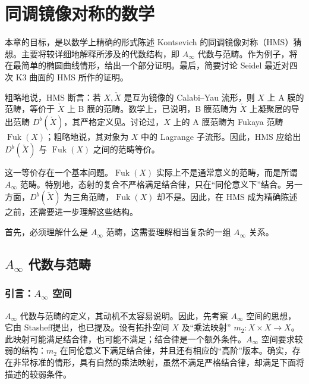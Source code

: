\chapter{同调镜像对称的数学}\label{chap:8}

本章的目标，是以数学上精确的形式陈述 Kontsevich 的同调镜像对称（HMS）猜想。主要将较详细地解释所涉及的代数结构，即 $A_\infty$ 代数与范畴。作为例子，将在最简单的椭圆曲线情形，给出一个部分证明。最后，简要讨论 Seidel 最近对四次 K3 曲面的 HMS 所作的证明。

粗略地说，HMS 断言：若 $X,\check X$ 是互为镜像的 Calabi--Yau 流形，则 $X$ 上 A 膜的范畴，等价于 $\check X$ 上 B 膜的范畴。数学上，已说明，B 膜范畴为 $\check X$ 上凝聚层的导出范畴 $D^b(\check X)$，其严格定义见。讨论过，$X$ 上的 A 膜范畴为 Fukaya 范畴 $\operatorname{Fuk}(X)$；粗略地说，其对象为 $X$ 中的 Lagrange 子流形。因此，HMS 应给出 $D^b(\check X)$ 与 $\operatorname{Fuk}(X)$ 之间的范畴等价。

这一等价存在一个基本问题。$\operatorname{Fuk}(X)$ 实际上不是通常意义的范畴，而是所谓 $A_\infty$ 范畴。特别地，态射的复合不严格满足结合律，只在“同伦意义下”结合。另一方面，$D^b(\check X)$ 为三角范畴，$\operatorname{Fuk}(X)$ 却不是。因此，在 HMS 成为精确陈述之前，还需要进一步理解这些结构。

首先，必须理解什么是 $A_\infty$ 范畴，这需要理解相当复杂的一组 $A_\infty$ 关系。

\section{\texorpdfstring{$A_\infty$}{A∞} 代数与范畴}\label{sec:8.1}
\subsection{引言：\texorpdfstring{$A_\infty$}{A∞} 空间}\label{sec:8.1.1}

$A_\infty$ 代数与范畴的定义，其动机不太容易说明。因此，先考察 $A_\infty$ 空间的思想，它由 Stasheff提出，也已提及。设有拓扑空间 $X$ 及“乘法映射” $m_2\colon X\times X\to X$。此映射可能满足结合律，也可能不满足；结合律是一个额外条件。$A_\infty$ 空间要求较弱的结构：$m_2$ 在同伦意义下满足结合律，并且还有相应的“高阶”版本。确实，存在非常标准的情形，具有自然的乘法映射，虽然不满足严格结合律，却满足下面将描述的较弱条件。

